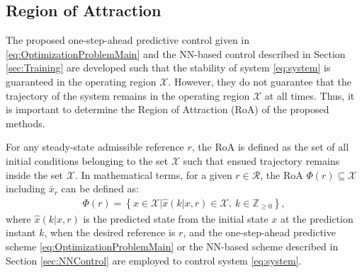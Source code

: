 \documentclass[1p,times]{elsarticle}
\begin{document}







\subsection{Region of Attraction}\label{sec:RoA}
The proposed one-step-ahead predictive control given in \eqref{eq:OptimizationProblemMain} and the NN-based control described in Section \ref{sec:Training} are developed such that the stability of system \eqref{eq:system} is guaranteed in the operating region $\mathcal{X}$. However, they do not guarantee that the trajectory of the system remains in the operating region $\mathcal{X}$ at all times. Thus, it is important to determine the Region of Attraction (RoA) of the proposed methods. 


For any steady-state admissible reference $r$, the RoA is defined as the set of all initial conditions belonging to the set $\mathcal{X}$ such that ensued trajectory remains inside the set $\mathcal{X}$. In mathematical terms, for a given $r\in\mathcal{R}$, the RoA $\Phi(r)\subseteq\mathcal{X}$ including $\bar{x}_r$ can be defined as:
\begin{align}\label{eq:RoA}
\Phi(r)=\left\{x\in\mathcal{X}|\hat{x}(k|x,r)\in\mathcal{X},~k\in\mathbb{Z}_{\geq0}\right\}, 
\end{align}
where $\hat{x}(k|x,r)$ is the predicted state from the initial state $x$ at the prediction instant $k$, when the desired reference is $r$, and the one-step-ahead predictive scheme \eqref{eq:OptimizationProblemMain} or the NN-based scheme described in Section \ref{sec:NNControl} are employed to control system \ref{eq:system}. 
\end{document}

